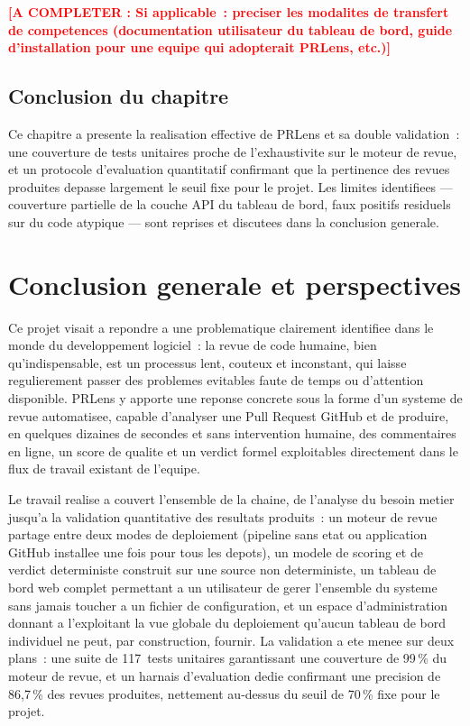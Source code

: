 \documentclass[a4paper,12pt,oneside]{report}
\newcommand{\todo}[1]{\textcolor{red}{\textbf{[A COMPLETER : #1]}}}
\begin{document}
\todo{Si applicable~: preciser les modalites de transfert de competences (documentation utilisateur du tableau de bord, guide d'installation pour une equipe qui adopterait PRLens, etc.)}

\section*{Conclusion du chapitre}

Ce chapitre a presente la realisation effective de PRLens et sa double validation~: une couverture de tests unitaires proche de l'exhaustivite sur le moteur de revue, et un protocole d'evaluation quantitatif confirmant que la pertinence des revues produites depasse largement le seuil fixe pour le projet. Les limites identifiees --- couverture partielle de la couche API du tableau de bord, faux positifs residuels sur du code atypique --- sont reprises et discutees dans la conclusion generale.

\chapter*{Conclusion generale et perspectives}

Ce projet visait a repondre a une problematique clairement identifiee dans le monde du developpement logiciel~: la revue de code humaine, bien qu'indispensable, est un processus lent, couteux et inconstant, qui laisse regulierement passer des problemes evitables faute de temps ou d'attention disponible. PRLens y apporte une reponse concrete sous la forme d'un systeme de revue automatisee, capable d'analyser une Pull Request GitHub et de produire, en quelques dizaines de secondes et sans intervention humaine, des commentaires en ligne, un score de qualite et un verdict formel exploitables directement dans le flux de travail existant de l'equipe.

Le travail realise a couvert l'ensemble de la chaine, de l'analyse du besoin metier jusqu'a la validation quantitative des resultats produits~: un moteur de revue partage entre deux modes de deploiement (pipeline sans etat ou application GitHub installee une fois pour tous les depots), un modele de scoring et de verdict deterministe construit sur une source non deterministe, un tableau de bord web complet permettant a un utilisateur de gerer l'ensemble du systeme sans jamais toucher a un fichier de configuration, et un espace d'administration donnant a l'exploitant la vue globale du deploiement qu'aucun tableau de bord individuel ne peut, par construction, fournir. La validation a ete menee sur deux plans~: une suite de 117~tests unitaires garantissant une couverture de 99\,\% du moteur de revue, et un harnais d'evaluation dedie confirmant une precision de 86,7\,\% des revues produites, nettement au-dessus du seuil de 70\,\% fixe pour le projet.
\end{document}
